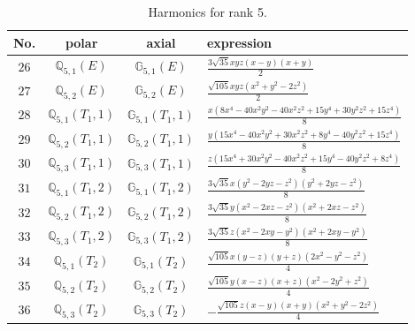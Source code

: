 \documentclass[fleqn,8pt,landscape]{jsarticle}
\begin{document}
\begin{table}[ht!]
\begin{center}
\caption{Harmonics for rank 5.}
\renewcommand{\arraystretch}{1.3}
\begin{tabular}{cccl} \hline \hline
No. & polar & axial & expression \\ \hline
$ 26 $ & $ \mathbb{Q}_{5,1}(E) $ & $ \mathbb{G}_{5,1}(E) $ & $ \frac{3 \sqrt{35} x y z \left(x - y\right) \left(x + y\right)}{2} $ \\
$ 27 $ & $ \mathbb{Q}_{5,2}(E) $ & $ \mathbb{G}_{5,2}(E) $ & $ \frac{\sqrt{105} x y z \left(x^{2} + y^{2} - 2 z^{2}\right)}{2} $ \\
$ 28 $ & $ \mathbb{Q}_{5,1}(T_{1},1) $ & $ \mathbb{G}_{5,1}(T_{1},1) $ & $ \frac{x \left(8 x^{4} - 40 x^{2} y^{2} - 40 x^{2} z^{2} + 15 y^{4} + 30 y^{2} z^{2} + 15 z^{4}\right)}{8} $ \\
$ 29 $ & $ \mathbb{Q}_{5,2}(T_{1},1) $ & $ \mathbb{G}_{5,2}(T_{1},1) $ & $ \frac{y \left(15 x^{4} - 40 x^{2} y^{2} + 30 x^{2} z^{2} + 8 y^{4} - 40 y^{2} z^{2} + 15 z^{4}\right)}{8} $ \\
$ 30 $ & $ \mathbb{Q}_{5,3}(T_{1},1) $ & $ \mathbb{G}_{5,3}(T_{1},1) $ & $ \frac{z \left(15 x^{4} + 30 x^{2} y^{2} - 40 x^{2} z^{2} + 15 y^{4} - 40 y^{2} z^{2} + 8 z^{4}\right)}{8} $ \\
$ 31 $ & $ \mathbb{Q}_{5,1}(T_{1},2) $ & $ \mathbb{G}_{5,1}(T_{1},2) $ & $ \frac{3 \sqrt{35} x \left(y^{2} - 2 y z - z^{2}\right) \left(y^{2} + 2 y z - z^{2}\right)}{8} $ \\
$ 32 $ & $ \mathbb{Q}_{5,2}(T_{1},2) $ & $ \mathbb{G}_{5,2}(T_{1},2) $ & $ \frac{3 \sqrt{35} y \left(x^{2} - 2 x z - z^{2}\right) \left(x^{2} + 2 x z - z^{2}\right)}{8} $ \\
$ 33 $ & $ \mathbb{Q}_{5,3}(T_{1},2) $ & $ \mathbb{G}_{5,3}(T_{1},2) $ & $ \frac{3 \sqrt{35} z \left(x^{2} - 2 x y - y^{2}\right) \left(x^{2} + 2 x y - y^{2}\right)}{8} $ \\
$ 34 $ & $ \mathbb{Q}_{5,1}(T_{2}) $ & $ \mathbb{G}_{5,1}(T_{2}) $ & $ \frac{\sqrt{105} x \left(y - z\right) \left(y + z\right) \left(2 x^{2} - y^{2} - z^{2}\right)}{4} $ \\
$ 35 $ & $ \mathbb{Q}_{5,2}(T_{2}) $ & $ \mathbb{G}_{5,2}(T_{2}) $ & $ \frac{\sqrt{105} y \left(x - z\right) \left(x + z\right) \left(x^{2} - 2 y^{2} + z^{2}\right)}{4} $ \\
$ 36 $ & $ \mathbb{Q}_{5,3}(T_{2}) $ & $ \mathbb{G}_{5,3}(T_{2}) $ & $ - \frac{\sqrt{105} z \left(x - y\right) \left(x + y\right) \left(x^{2} + y^{2} - 2 z^{2}\right)}{4} $ \\
 \hline \hline
\end{tabular}
\end{center}
\end{table}
\end{document}
